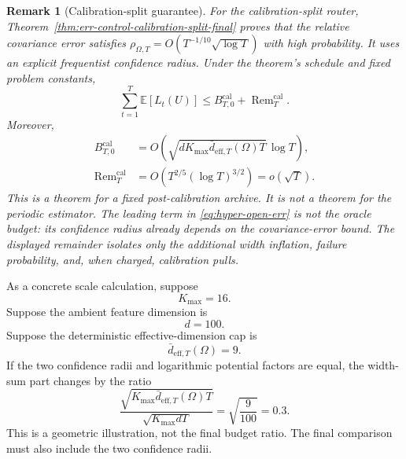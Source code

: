 \documentclass{article} %
\newtheorem{remark}{Remark}
\begin{document}
\begin{remark}[Calibration-split guarantee]
For the calibration-split router, Theorem~\ref{thm:err-control-calibration-split-final} proves that the relative covariance error satisfies $\rho_{\Omega,T}=O(T^{-1/10}\sqrt{\log T})$ with high probability. It uses an explicit frequentist confidence radius. Under the theorem's schedule and fixed problem constants,
\begin{equation}
\label{eq:hyper-open-err}
\sum_{t=1}^{T}\mathbb{E}[L_t(U)]
\le
B_{T,0}^{\mathrm{cal}}
+
\operatorname{Rem}_T^{\mathrm{cal}}.
\end{equation}
Moreover,
\begin{align}
B_{T,0}^{\mathrm{cal}}
&=
O\!\left(
\sqrt{dK_{\max}\bar d_{\mathrm{eff},T}(\Omega)T}\,\log T
\right),
\label{eq:hyper-open-leading}\\
\operatorname{Rem}_T^{\mathrm{cal}}
&=
O\!\left(T^{2/5}(\log T)^{3/2}\right)
=o(\sqrt T).
\label{eq:hyper-open-remainder}
\end{align}
This is a theorem for a fixed post-calibration archive. It is not a theorem for the periodic estimator.
The leading term in \eqref{eq:hyper-open-err} is not the oracle budget: its
confidence radius already depends on the covariance-error bound. The displayed
remainder isolates only the additional width inflation, failure probability,
and, when charged, calibration pulls.
\end{remark}

As a concrete scale calculation, suppose
\begin{equation}
\label{eq:hyper-example-k}
K_{\max}=16.
\end{equation}
Suppose the ambient feature dimension is
\begin{equation}
\label{eq:hyper-example-d}
d=100.
\end{equation}
Suppose the deterministic effective-dimension cap is
\begin{equation}
\label{eq:hyper-example-deff}
\bar d_{\mathrm{eff},T}(\Omega)=9.
\end{equation}
If the two confidence radii and logarithmic potential factors are equal, the width-sum part changes by the ratio
\begin{equation}
\label{eq:hyper-example-ratio}
\frac{
\sqrt{K_{\max}\bar d_{\mathrm{eff},T}(\Omega)T}
}{
\sqrt{K_{\max}dT}
}
=
\sqrt{\frac{9}{100}}
=
0.3.
\end{equation}
This is a geometric illustration, not the final budget ratio. The final comparison must also include the two confidence radii.
\end{document}
